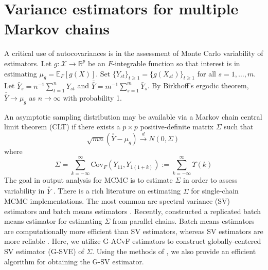 \documentclass[11pt]{article}
\newcommand{\Cov}{\text{Cov}}
\newcommand{\X}{\mathcal{X}}
\theoremstyle{remark}
\begin{document}
\section{Variance estimators for multiple Markov chains} \label{sec:variance_est}

A critical use of autocovariances is in the assessment of Monte Carlo variability of estimators.  Let $g:\X \longrightarrow \mathbb{R}^p$ be an $F$-integrable function so that interest is in estimating
$\mu_g = \mathbb{E}_F[g(X)]$.
Set $\{Y_{st}\}_{t \geq 1} = \{g(X_{st})\}_{t \geq 1}$ for all $s = 1, \dots, m$. Let $\bar{Y}_s = n^{-1}\sum_{t=1}^{n}Y_{st}$  and  $\bar{\bar{Y}} = m^{-1}\sum_{s=1}^{m}\bar{Y}_s$. By Birkhoff's ergodic theorem,  $\bar{\bar{Y}} \to \mu_g$ as $n \to \infty$ with probability 1.

An asymptotic sampling distribution may be available via a Markov chain central limit theorem (CLT) if there exists a $p \times p$ positive-definite matrix $\Sigma$ such that
%
\begin{equation}
\label{eq:CLT}
  \sqrt{mn}(\bar{\bar{Y}} - \mu_g) \xrightarrow{d} N(0,\Sigma)\,
\end{equation}
where
\begin{equation}
\label{eq:sigma}
  \Sigma = \sum_{k = -\infty}^{\infty} \Cov_F \left( Y_{11}, Y_{1(1+k)} \right) := \sum_{k = -\infty}^{\infty}\Upsilon (k)
\end{equation}
%
The goal in output analysis for MCMC is to estimate $\Sigma$ in order to assess variability in $\bar{\bar{Y}}$ \citep{fleg:hara:jone:2008,roy:2019,vats:rob:fle:jon:2020}. There is a rich literature on estimating $\Sigma$ for single-chain MCMC implementations. The most common are spectral variance (SV) estimators \citep{andr:1991,vats:fleg:jon:2018} and batch means estimators \citep{chen:seila:1987,vats:fleg:jon:2019}. Recently, \cite{gupta:vats:2020} constructed a replicated batch means estimator for estimating $\Sigma$ from parallel chains. Batch means estimators are computationally more efficient than SV estimators, whereas SV estimators are more reliable \citep{fleg:jone:2010}. Here, we utilize G-ACvF estimators to construct globally-centered SV estimator (G-SVE) of $\Sigma$. Using the methods of \cite{heberle2017fast}, we also provide an efficient algorithm for obtaining the G-SV estimator. 
\end{document}
